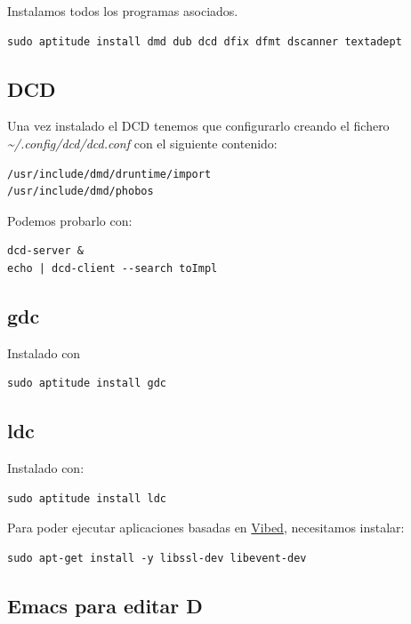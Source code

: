 \documentclass[12pt,spanish,]{scrartcl}
\begin{document}
Instalamos todos los programas asociados.

\begin{verbatim}
sudo aptitude install dmd dub dcd dfix dfmt dscanner textadept
\end{verbatim}

\subsection{DCD}\label{dcd}

Una vez instalado el DCD tenemos que configurarlo creando el fichero
\emph{\textasciitilde{}/.config/dcd/dcd.conf} con el siguiente
contenido:

\begin{verbatim}
/usr/include/dmd/druntime/import
/usr/include/dmd/phobos
\end{verbatim}

Podemos probarlo con:

\begin{verbatim}
dcd-server &
echo | dcd-client --search toImpl
\end{verbatim}

\subsection{gdc}\label{gdc}

Instalado con

\begin{verbatim}
sudo aptitude install gdc
\end{verbatim}

\subsection{ldc}\label{ldc}

Instalado con:

\begin{verbatim}
sudo aptitude install ldc
\end{verbatim}

Para poder ejecutar aplicaciones basadas en
\href{http://vibed.org/}{Vibed}, necesitamos instalar:

\begin{verbatim}
sudo apt-get install -y libssl-dev libevent-dev
\end{verbatim}

\subsection{Emacs para editar D}\label{emacs-para-editar-d}
\end{document}

